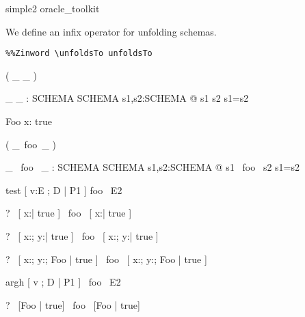 \begin{zsection}
\SECTION simple2 \parents oracle\_toolkit
\end{zsection}

We define an infix operator for unfolding schemas.


\newcommand{\unfoldsTo}{\mathrel{\leadsto}}

\begin{verbatim}
%%Zinword \unfoldsTo unfoldsTo
\end{verbatim}

\begin{zed}
  \relation ( \_ \unfoldsTo \_ )
\end{zed}

\begin{gendef}[SCHEMA]
  \_ \unfoldsTo \_ : SCHEMA \rel SCHEMA
\where
  \forall s1,s2:SCHEMA @ s1 \unfoldsTo s2 \iff s1=s2
\end{gendef}


\begin{schema}{Foo}
  x:\nat
\where
  true
\end{schema}

\begin{zed}
  \relation ( \_~foo~\_ )
\end{zed}

\begin{gendef}[SCHEMA]
  \_ ~foo~ \_ : SCHEMA \rel SCHEMA
\where
  \forall s1,s2:SCHEMA @ s1 ~foo~ s2 \iff s1=s2
\end{gendef}

\begin{zedrule}{test}
  [ v:E ; D | P1 ] foo~ E2
\end{zedrule}

\begin{zed}
  \vdash?~ [ x:\nat | true ] ~foo~ [ x:\nat | true ]
\end{zed}

\begin{zed}
  \vdash?~ [ x:\nat; y:\nat | true ] ~foo~ [ x:\nat; y:\nat | true ]
\end{zed}

\begin{zed}
  \vdash?~ [ x:\nat; y:\nat ; Foo | true ] ~foo~
           [ x:\nat; y:\nat ; Foo | true ]
\end{zed}


\begin{zedrule}{argh}
  [ v ; D | P1 ] ~foo~ E2
\end{zedrule}

\begin{zed}
  \vdash?~ [Foo | true] ~foo~ [Foo | true]
\end{zed}

